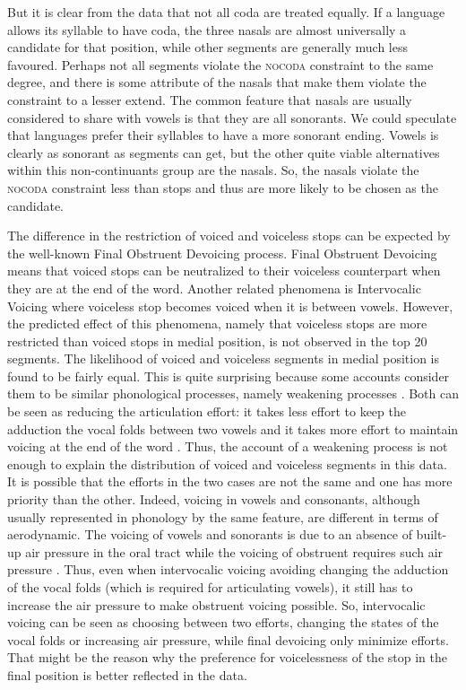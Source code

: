 \par
But it is clear from the data that not all coda are treated equally. 
If a language allows its syllable to have coda, the three nasals are almost universally a candidate for that position, while other segments are generally much less favoured.
Perhaps not all segments violate the \textsc{nocoda} constraint to the same degree, and there is some attribute of the nasals that make them violate the constraint to a lesser extend.
The common feature that nasals are usually considered to share with vowels is that they are all sonorants.
We could speculate that languages prefer their syllables to have a more sonorant ending.
Vowels is clearly as sonorant as segments can get, but the other quite viable alternatives within this non-continuants group are the nasals.
So, the nasals violate the \textsc{nocoda} constraint less than stops and thus are more likely to be chosen as the candidate.

\par
The difference in the restriction of voiced and voiceless stops can be expected by the well-known Final Obstruent Devoicing process. 
Final Obstruent Devoicing means that voiced stops can be neutralized to their voiceless counterpart when they are at the end of the word. 
Another related phenomena is Intervocalic Voicing where voiceless stop becomes voiced when it is between vowels. 
However, the predicted effect of this phenomena, namely that voiceless stops are more restricted than voiced stops in medial position, is not observed in the top 20 segments.
The likelihood of voiced and voiceless segments in medial position is found to be fairly equal.
This is quite surprising because some accounts consider them to be similar phonological processes, namely weakening processes \citep{Gordon_2016, harris2009final}.
Both can be seen as reducing the articulation effort: it takes less effort to keep the adduction the vocal folds between two vowels and it takes more effort to maintain voicing at the end of the word \citep{Gordon_2016}. 
Thus, the account of a weakening process is not enough to explain the distribution of voiced and voiceless segments in this data.
It is possible that the efforts in the two cases are not the same and one has more priority than the other.
Indeed, voicing in vowels and consonants, although usually represented in phonology by the same feature, are different in terms of aerodynamic.
The voicing of vowels and sonorants is due to an absence of built-up air pressure in the oral tract while the voicing of obstruent requires such air pressure \citep{harris2009final}.
Thus, even when intervocalic voicing avoiding changing the adduction of the vocal folds (which is required for articulating vowels), it still has to increase the air pressure to make obstruent voicing possible.
So, intervocalic voicing can be seen as choosing between two efforts, changing the states of the vocal folds or increasing air pressure, while final devoicing only minimize efforts. 
That might be the reason why the preference for voicelessness of the stop in the final position is better reflected in the data.

